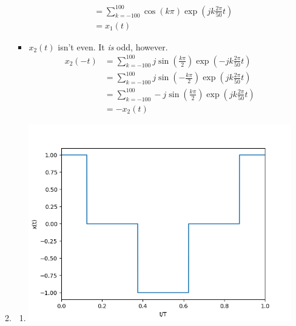 \documentclass[12pt]{article}
\begin{document}
\begin{enumerate}
\begin{enumerate}
\begin{itemize}
\begin{align*}
                                           & = \sum_{k=-100}^{100} \cos(k\pi)\exp\left(jk\frac{2\pi}{50}t\right)  \\
                                           & = x_1(t)
                                    \end{align*}
                              \item $x_2(t)$ isn't even. It \textit{is} odd, however.
                                    \begin{align*}
                                          x_2(-t)
                                           & = \sum_{k=-100}^{100} j\sin\left(\frac{k\pi}{2}\right)\exp\left(-jk\frac{2\pi}{50}t\right) \\
                                           & = \sum_{k=-100}^{100} j\sin\left(-\frac{k\pi}{2}\right)\exp\left(jk\frac{2\pi}{50}t\right) \\
                                           & = \sum_{k=-100}^{100} -j\sin\left(\frac{k\pi}{2}\right)\exp\left(jk\frac{2\pi}{50}t\right) \\
                                           & = -x_2(t)
                                    \end{align*}
                        \end{itemize}
                  \item \begin{enumerate}
                              \item \includegraphics[width=12cm]{img/hw4/even}

\end{enumerate}
\end{enumerate}
\end{enumerate}
\end{document}
